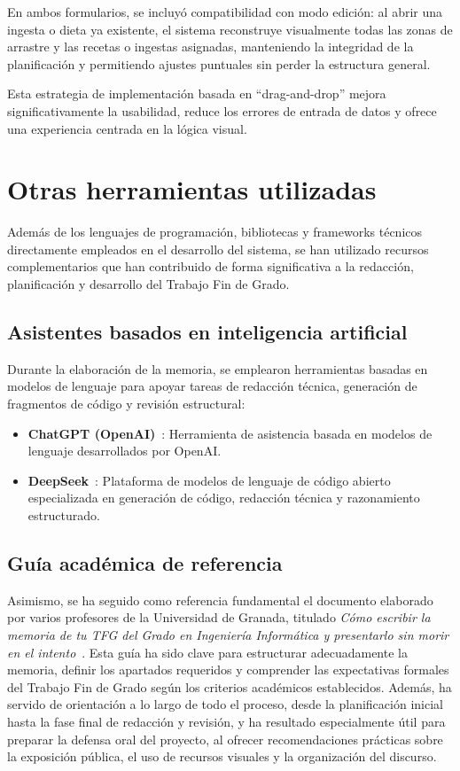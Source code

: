En ambos formularios, se incluyó compatibilidad con modo edición: al abrir una ingesta o dieta ya existente, el sistema reconstruye visualmente todas las zonas de arrastre y las recetas o ingestas asignadas, manteniendo la integridad de la planificación y permitiendo ajustes puntuales sin perder la estructura general.

Esta estrategia de implementación basada en ``drag-and-drop'' mejora significativamente la usabilidad, reduce los errores de entrada de datos y ofrece una experiencia centrada en la lógica visual.

\section{Otras herramientas utilizadas}

Además de los lenguajes de programación, bibliotecas y frameworks técnicos directamente empleados en el desarrollo del sistema, se han utilizado recursos complementarios que han contribuido de forma significativa a la redacción, planificación y desarrollo del Trabajo Fin de Grado.

\subsection*{Asistentes basados en inteligencia artificial}

Durante la elaboración de la memoria, se emplearon herramientas basadas en modelos de lenguaje para apoyar tareas de redacción técnica, generación de fragmentos de código y revisión estructural:

\begin{itemize}
    \item \textbf{ChatGPT (OpenAI)}~\cite{chatgpt}: Herramienta de asistencia basada en modelos de lenguaje desarrollados por OpenAI. 
    
    \item \textbf{DeepSeek}~\cite{deepseek}: Plataforma de modelos de lenguaje de código abierto especializada en generación de código, redacción técnica y razonamiento estructurado. 
\end{itemize}

\subsection*{Guía académica de referencia}

Asimismo, se ha seguido como referencia fundamental el documento elaborado por varios profesores de la Universidad de Granada, titulado \textit{Cómo escribir la memoria de tu TFG del Grado en Ingeniería Informática y presentarlo sin morir en el intento}~\cite{guillen2025memoria}. Esta guía ha sido clave para estructurar adecuadamente la memoria, definir los apartados requeridos y comprender las expectativas formales del Trabajo Fin de Grado según los criterios académicos establecidos. Además, ha servido de orientación a lo largo de todo el proceso, desde la planificación inicial hasta la fase final de redacción y revisión, y ha resultado especialmente útil para preparar la defensa oral del proyecto, al ofrecer recomendaciones prácticas sobre la exposición pública, el uso de recursos visuales y la organización del discurso.

